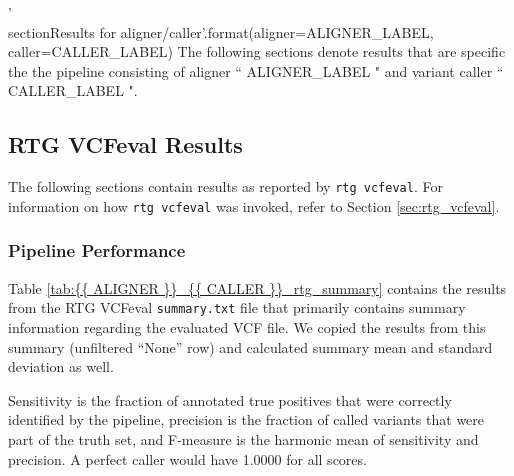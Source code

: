 {{ '\\section{{Results for {aligner}/{caller}}}'.format(aligner=ALIGNER_LABEL, caller=CALLER_LABEL) }}
The following sections denote results that are specific the the pipeline consisting of aligner ``{{ ALIGNER_LABEL }}" and variant caller ``{{ CALLER_LABEL }}".

\subsection{RTG VCFeval Results}
The following sections contain results as reported by \texttt{rtg vcfeval}. 
For information on how \texttt{rtg vcfeval} was invoked, refer to Section \ref{sec:rtg_vcfeval}.

\subsubsection{Pipeline Performance}
Table \ref{tab:{{ ALIGNER }}_{{ CALLER }}_rtg_summary} contains the results from the RTG VCFeval \texttt{summary.txt} file that primarily contains summary information regarding the evaluated VCF file. 
We copied the results from this summary (unfiltered ``None'' row) and calculated summary mean and standard deviation as well.

Sensitivity is the fraction of annotated true positives that were correctly identified by the pipeline, 
precision is the fraction of called variants that were part of the truth set, 
and F-measure is the harmonic mean of sensitivity and precision. 
A perfect caller would have 1.0000 for all scores.

